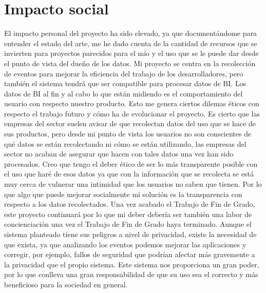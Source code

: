 \section{Impacto social}\label{sec:imsoc}
El impacto personal del proyecto ha sido elevado, ya que documentándome para entender el estado del arte, me he dado cuenta de la cantidad de recursos que se invierten para proyectos parecidos para el mío y el uso que se le puede dar desde el punto de vista del dueño de los datos. Mi proyecto se centra en la recolección de eventos para mejorar la eficiencia del trabajo de los desarrolladores, pero también el sistema tendrá que ser compatible para procesar datos de BI.
Los datos de BI al fin y al cabo lo que están midiendo es el comportamiento del usuario con respecto nuestro producto. Esto me genera ciertos dilemas éticos con respecto el trabajo futuro y cómo ha de evolucionar el proyecto. Es cierto que las empresas del sector suelen avisar de que recolectan datos del uso que se hace de sus productos, pero desde mi punto de vista los usuarios no son conscientes de qué datos se están recolectando ni cómo se están utilizando, las empresas del sector no acaban de asegurar que hacen con tales datos una vez han sido procesados.
Creo que tengo el deber ético de ser lo más transparente posible con el uso que haré de esos datos ya que con la información que se recolecta se está muy cerca de vulnerar una intimidad que los usuarios no saben que tienen. Por lo que algo que puede mejorar socialmente mi solución es la transparencia con respecto a los datos recolectados. Una vez acabado el Trabajo de Fin de Grado, este proyecto continuará por lo que mi deber debería ser también una labor de concienciación una vez el Trabajo de Fin de Grado haya terminado.
Aunque el sistema planteado tiene sus peligros a nivel de privacidad, existe la necesidad de que exista, ya que analizando los eventos podemos mejorar las aplicaciones y corregir, por ejemplo, fallos de seguridad que podrían afectar más gravemente a la privacidad que el propio sistema. Este sistema nos proporciona un gran poder, por lo que conlleva una gran responsabilidad de que su uso sea el correcto y más beneficioso para la sociedad en general.

